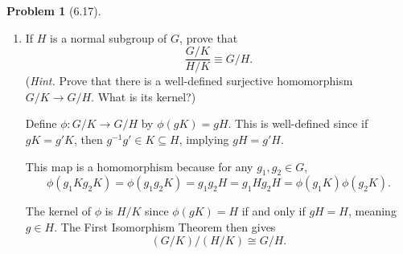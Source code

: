 \documentclass[12pt]{article}
\theoremstyle{definition}
\newtheorem{problem}{Problem}
\begin{document}
\begin{problem}[6.17]
\begin{enumerate}[label=(\alph*)]
        \item If $H$ is a normal subgroup of $G$, prove that
              \[
                  \frac{G/K}{H/K} \equiv G/H.
              \]
              (\textit{Hint.} Prove that there is a well-defined surjective homomorphism $G/K \longrightarrow G/H$. What is its kernel?)
       
        \begin{solution}
            Define $\phi: G/K \to G/H$ by $\phi(gK) = gH$. This is well-defined since if $gK = g'K$, then $g^{-1}g' \in K \subseteq H$, implying $gH = g'H$.
            
            This map is a homomorphism because for any $g_1, g_2 \in G$,
            \[
            \phi(g_1K g_2K) = \phi(g_1g_2K) = g_1g_2H = g_1H g_2H = \phi(g_1K) \phi(g_2K).
            \]
            
            The kernel of $\phi$ is $H/K$ since $\phi(gK) = H$ if and only if $gH = H$, meaning $g \in H$. The First Isomorphism Theorem then gives
            \[
            (G/K) / (H/K) \cong G/H.
            \]
        \end{solution}
    \end{enumerate}
\end{problem}
\end{document}
